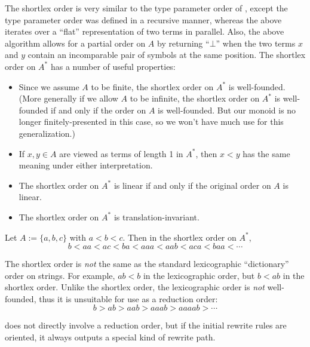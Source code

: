 \documentclass[../generics]{subfiles}
\begin{document}
The shortlex order is very similar to the type parameter order of , except the type parameter order was defined in a recursive manner, whereas the above iterates over a ``flat'' representation of two terms in parallel. Also, the above algorithm allows for a partial order on $A$ by returning ``$\bot$'' when the two terms $x$ and $y$ contain an incomparable pair of symbols at the same position. The shortlex order on $A^*$ has a number of useful properties:
\begin{itemize}
\item Since we assume $A$ to be finite, the shortlex order on $A^*$ is well-founded. (More generally if we allow $A$ to be infinite, the shortlex order on $A^*$ is well-founded if and only if the order on $A$ is well-founded. But our monoid is no longer finitely-presented in this case, so we won't have much use for this generalization.)
\item If $x,y\in A$ are viewed as terms of length 1 in $A^*$, then $x<y$ has the same meaning under either interpretation.
\item The shortlex order on $A^*$ is linear if and only if the original order on $A$ is linear.
\item The shortlex order on $A^*$ is translation-invariant.
\end{itemize}
\begin{example} Let $A:=\{a,b,c\}$ with $a<b<c$. Then in the shortlex order on $A^*$,
\[b<aa<ac<ba<aaa<aab<aca<baa<\cdots\]
\end{example}
The shortlex order is \emph{not} the same as the standard lexicographic ``dictionary'' order on strings. For example, $ab<b$ in the lexicographic order, but $b<ab$ in the shortlex order. Unlike the shortlex order, the lexicographic order is \emph{not} well-founded, thus it is unsuitable for use as a reduction order:
\[b>ab>aab>aaab>aaaab>\cdots\]

 does not directly involve a reduction order, but if the initial rewrite rules are oriented, it always outputs a special kind of rewrite path.
\end{document}
